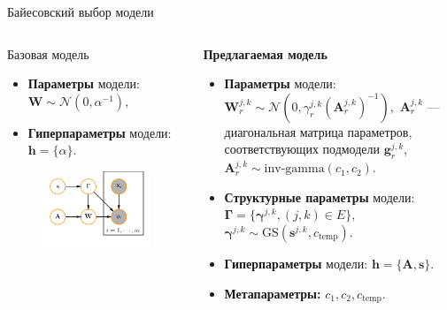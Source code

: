 \documentclass[usenames,dvipsnames,11pt,pdf,utf8,russian,aspectratio=43]{beamer}
\begin{document}
\begin{frame}{Байесовский выбор модели}


\begin{columns}
\begin{column}{0.4\textwidth}
Базовая модель %
\begin{itemize}
\item \textbf{Параметры} модели:\\ $\mathbf{W} \sim \mathcal{N}(0, \alpha^{-1}),$
\item \textbf{Гиперпараметры} модели: $\mathbf{h} = \{\alpha\}.$
\end{itemize}
\begin{figure}
\includegraphics[width=\textwidth]{simple_plate_concrete.pdf}
\end{figure}
\end{column}
\begin{column}{0.6\textwidth}
\textbf{Предлагаемая модель  }
\begin{itemize}
\item \textbf{Параметры} модели:\\ $\mathbf{W}_r^{j,k} \sim \mathcal{N}(0, \gamma_{r}^{j,k} (\mathbf{A}_r^{j,k})^{-1}),$
$\mathbf{A}_r^{j,k}$ --- диагональная матрица параметров, соответствующих подмодели $\mathbf{g}_r^{j,k}$,
\\$\mathbf{A}_r^{j,k} \sim \text{inv-gamma}(c_1,c_2)$.

\item \textbf{Структурные параметры} модели:\\$\boldsymbol{\Gamma} = \{\boldsymbol{\gamma}^{j,k}, (j,k) \in E\},$ \\$\boldsymbol{\gamma}^{j,k} \sim \text{GS}(\mathbf{s}^{j,k}, c_\text{temp}).$ 
\item \textbf{Гиперпараметры} модели: $\mathbf{h} = \{\mathbf{A}, \mathbf{s} \}.$
\item \textbf{Метапараметры:} $c_1,c_2,c_\text{temp}$.
\end{itemize}


\end{column}
\end{columns}
\end{frame}
\end{document}

